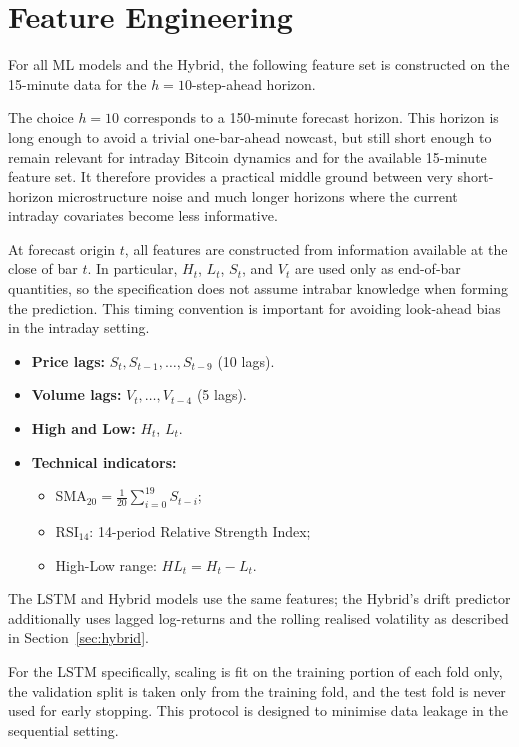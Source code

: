 \documentclass[12pt, a4paper, oneside]{report}
\theoremstyle{plain}
\theoremstyle{definition}
\theoremstyle{remark}
\begin{document}
\section{Feature Engineering}

For all ML models and the Hybrid, the following feature set is constructed on
the 15-minute data for the $h = 10$-step-ahead horizon.

The choice $h = 10$ corresponds to a 150-minute forecast horizon.  This horizon
is long enough to avoid a trivial one-bar-ahead nowcast, but still short enough
to remain relevant for intraday Bitcoin dynamics and for the available 15-minute
feature set.  It therefore provides a practical middle ground between very
short-horizon microstructure noise and much longer horizons where the current
intraday covariates become less informative.

At forecast origin $t$, all features are constructed from information available
at the close of bar $t$.  In particular, $H_t$, $L_t$, $S_t$, and $V_t$ are used
only as end-of-bar quantities, so the specification does not assume intrabar
knowledge when forming the prediction.  This timing convention is important for
avoiding look-ahead bias in the intraday setting.

\begin{itemize}[leftmargin=1.25cm]
  \item \textbf{Price lags:} $S_t, S_{t-1}, \ldots, S_{t-9}$ (10 lags).
  \item \textbf{Volume lags:} $V_t, \ldots, V_{t-4}$ (5 lags).
  \item \textbf{High and Low:} $H_t$, $L_t$.
  \item \textbf{Technical indicators:}
    \begin{itemize}[leftmargin=1.25cm]
      \item SMA$_{20} = \frac{1}{20}\sum_{i=0}^{19}S_{t-i}$;
      \item RSI$_{14}$: 14-period Relative Strength Index;
      \item High-Low range: $HL_t = H_t - L_t$.
    \end{itemize}
\end{itemize}

The LSTM and Hybrid models use the same features; the Hybrid's drift predictor
additionally uses lagged log-returns and the rolling realised volatility as
described in Section~\ref{sec:hybrid}.

For the LSTM specifically, scaling is fit on the training portion of each fold
only, the validation split is taken only from the training fold, and the test
fold is never used for early stopping.  This protocol is designed to minimise
data leakage in the sequential setting.
\end{document}
